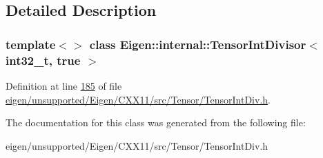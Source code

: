 \subsection{Detailed Description}
\subsubsection*{template$<$$>$\newline
class Eigen\+::internal\+::\+Tensor\+Int\+Divisor$<$ int32\+\_\+t, true $>$}



Definition at line \hyperlink{eigen_2unsupported_2_eigen_2_c_x_x11_2src_2_tensor_2_tensor_int_div_8h_source_l00185}{185} of file \hyperlink{eigen_2unsupported_2_eigen_2_c_x_x11_2src_2_tensor_2_tensor_int_div_8h_source}{eigen/unsupported/\+Eigen/\+C\+X\+X11/src/\+Tensor/\+Tensor\+Int\+Div.\+h}.



The documentation for this class was generated from the following file\+:\begin{DoxyCompactItemize}
\item 
eigen/unsupported/\+Eigen/\+C\+X\+X11/src/\+Tensor/\+Tensor\+Int\+Div.\+h\end{DoxyCompactItemize}
